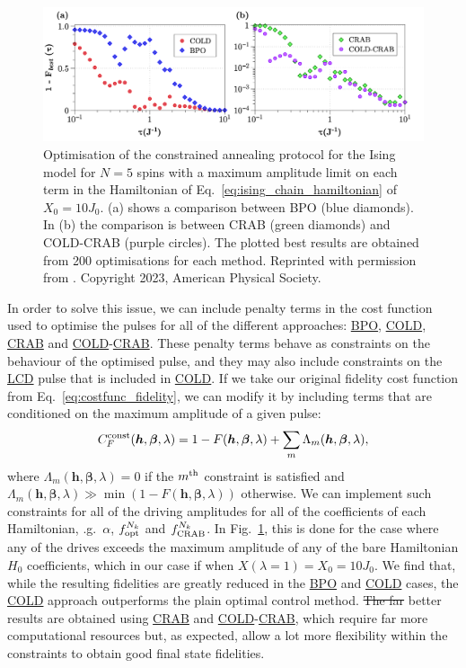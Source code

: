 \documentclass[a4paper,oneside,11pt]{book}
\newcommand{\betabb}{\boldsymbol{\beta}}
\newcommand{\hbb}{\boldsymbol{h}}
\newcommand{\acrref}[1]{\hyperref[acr:#1]{#1}}
\providecommand{\DIFaddtex}[1]{{\protect\color{blue}\uwave{#1}}} %
\providecommand{\DIFdeltex}[1]{{\protect\color{red}\sout{#1}}}                      %
\providecommand{\DIFaddbegin}{} %
\providecommand{\DIFaddend}{} %
\providecommand{\DIFdelbegin}{} %
\providecommand{\DIFdelend}{} %
\providecommand{\DIFadd}[1]{\texorpdfstring{\DIFaddtex{#1}}{#1}} %
\providecommand{\DIFdel}[1]{\texorpdfstring{\DIFdeltex{#1}}{}} %
\newcommand{\DIFscaledelfig}{0.5}
\newlength{\DIFdelgraphicswidth} %
\newlength{\DIFdelgraphicsheight} %
\newcommand{\DIFaddincludegraphics}[2][]{{\color{blue}\fbox{\DIFOincludegraphics[#1]{#2}}}} %
\newcommand{\DIFdelincludegraphics}[2][]{%
\sbox{\DIFdelgraphicsbox}{\DIFOincludegraphics[#1]{#2}}%
\settoboxwidth{\DIFdelgraphicswidth}{\DIFdelgraphicsbox} %
\settoboxtotalheight{\DIFdelgraphicsheight}{\DIFdelgraphicsbox} %
\scalebox{\DIFscaledelfig}{%
\parbox[b]{\DIFdelgraphicswidth}{\usebox{\DIFdelgraphicsbox}\\[-\baselineskip] \rule{\DIFdelgraphicswidth}{0em}}\llap{\resizebox{\DIFdelgraphicswidth}{\DIFdelgraphicsheight}{%
\setlength{\unitlength}{\DIFdelgraphicswidth}%
\begin{picture}(1,1)%
\thicklines\linethickness{2pt} %
{\color[rgb]{1,0,0}\put(0,0){\framebox(1,1){}}}%
{\color[rgb]{1,0,0}\put(0,0){\line( 1,1){1}}}%
{\color[rgb]{1,0,0}\put(0,1){\line(1,-1){1}}}%
\end{picture}%
}\hspace*{3pt}}} %
} %
\DeclareRobustCommand{\DIFaddbegin}{\DIFOaddbegin \let\includegraphics\DIFaddincludegraphics} %
\DeclareRobustCommand{\DIFaddend}{\DIFOaddend \let\includegraphics\DIFOincludegraphics} %
\DeclareRobustCommand{\DIFdelbegin}{\DIFOdelbegin \let\includegraphics\DIFdelincludegraphics} %
\DeclareRobustCommand{\DIFdelend}{\DIFOaddend \let\includegraphics\DIFOincludegraphics} %
\begin{document}
\begin{figure}[t]
    \centering
    \includegraphics[width=\linewidth]{images/IsingcConstrained.png} \caption[Applying COLD and COLD-CRAB to the Ising chain for 5 spins with constrained driving amplitudes.]{Optimisation of the constrained annealing protocol for the Ising model for $N=5$ spins with a maximum amplitude limit on each term in the Hamiltonian of Eq.~\eqref{eq:ising_chain_hamiltonian} of $X_0 = 10J_0$. (a) shows a comparison between BPO (blue diamonds). In (b) the comparison is between CRAB (green diamonds) and COLD-CRAB (purple circles). The plotted best results are obtained from 200 optimisations for each method. Reprinted with permission from \cite{cepaite_counterdiabatic_2023}. Copyright 2023, American Physical Society.}\label{fig:ising_constrained}
\end{figure}

In order to solve this issue, we can include penalty terms in the cost function used to optimise the pulses for all of the different approaches: \acrref{BPO}, \acrref{COLD}, \acrref{CRAB} and \acrref{COLD}-\acrref{CRAB}. These penalty terms behave as constraints on the behaviour of the optimised pulse, and they may also include constraints on the \acrref{LCD} pulse that is included in \acrref{COLD}. If we take our original fidelity cost function from Eq.~\eqref{eq:costfunc_fidelity}, we can modify it by including terms that are conditioned on the maximum amplitude of a given pulse:
\begin{equation}
    C_F^{\rm const}(\hbb, \betabb, \lambda) = 1 - F(\hbb, \betabb, \lambda) + \sum_m \Lambda_m(\hbb, \betabb, \lambda),
\end{equation}
where $\Lambda_m(\hbb, \betabb, \lambda) = 0$ if the $m^{\rm th}$ constraint is satisfied and $\Lambda_m(\hbb, \betabb, \lambda) \gg \min(1 - F(\hbb, \betabb, \lambda))$ otherwise. We can implement such constraints for all of the driving amplitudes for all of the coefficients of each Hamiltonian, \@e.g.~$\alpha$, $f_{\rm opt}^{N_k}$ and $f_{\rm CRAB}^{N_k}$. In Fig.~\ref{fig:ising_constrained}, this is done for the case where any of the drives exceeds the maximum amplitude of any of the bare Hamiltonian $H_0$ coefficients, which in our case if when $X(\lambda = 1) = X_0 = 10J_0$. We find that, while the resulting fidelities are greatly reduced in the \acrref{BPO} and \acrref{COLD} cases, the \acrref{COLD} approach outperforms the plain optimal control method. \DIFdelbegin \DIFdel{The far }\DIFdelend \DIFaddbegin \DIFadd{Far }\DIFaddend better results are obtained using \acrref{CRAB} and \acrref{COLD}-\acrref{CRAB}, which require far more computational resources but, as expected, allow a lot more flexibility within the constraints to obtain good final state fidelities. 
\end{document}
